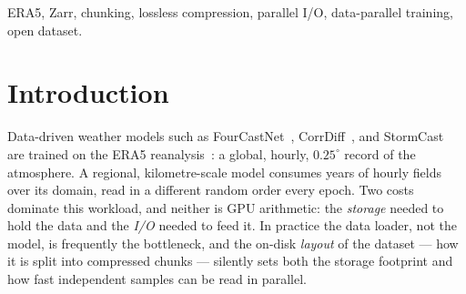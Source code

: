 \documentclass[conference]{IEEEtran}
\begin{document}
\begin{IEEEkeywords}
ERA5, Zarr, chunking, lossless compression, parallel I/O, data-parallel
training, open dataset.
\end{IEEEkeywords}

\vspace{0.5em}
\noindent{}

\section{Introduction}
Data-driven weather models such as FourCastNet~\cite{fcn},
CorrDiff~\cite{corrdiff}, and StormCast~\cite{stormcast} are trained on the
ERA5 reanalysis~\cite{era5}: a global, hourly, $0.25^\circ$ record of the
atmosphere. A regional, kilometre-scale model consumes years of hourly fields
over its domain, read in a different random order every epoch. Two costs
dominate this workload, and neither is GPU arithmetic: the \emph{storage}
needed to hold the data and the \emph{I/O} needed to feed it. In practice the
data loader, not the model, is frequently the bottleneck, and the on-disk
\emph{layout} of the dataset --- how it is split into compressed chunks ---
silently sets both the storage footprint and how fast independent samples can
be read in parallel.
\end{document}
